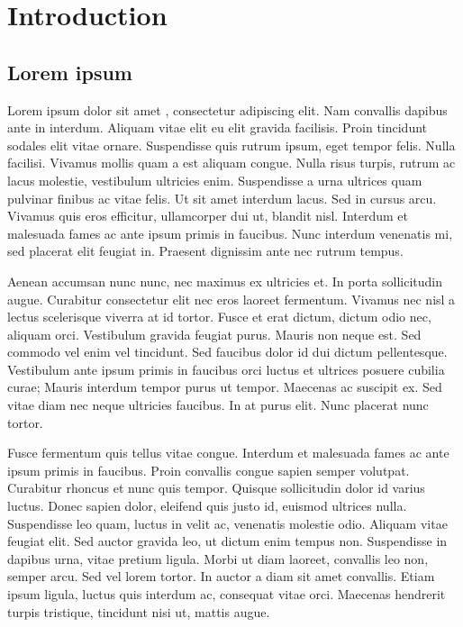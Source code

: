 \chapter{Introduction}

\section{Lorem ipsum}

Lorem ipsum dolor sit amet \cite{fake_citation} \cite{nichol2018gottalearnfast}, consectetur adipiscing elit. Nam convallis dapibus ante in interdum. Aliquam vitae elit eu elit gravida facilisis. Proin tincidunt sodales elit vitae ornare. Suspendisse quis rutrum ipsum, eget tempor felis. Nulla facilisi. Vivamus mollis quam a est aliquam congue. Nulla risus turpis, rutrum ac lacus molestie, vestibulum ultricies enim. Suspendisse a urna ultrices quam pulvinar finibus ac vitae felis. Ut sit amet interdum lacus. Sed in cursus arcu. Vivamus quis eros efficitur, ullamcorper dui ut, blandit nisl. Interdum et malesuada fames ac ante ipsum primis in faucibus. Nunc interdum venenatis mi, sed placerat elit feugiat in. Praesent dignissim ante nec rutrum tempus.

Aenean accumsan nunc nunc, nec maximus ex ultricies et. In porta sollicitudin augue. Curabitur consectetur elit nec eros laoreet fermentum. Vivamus nec nisl a lectus scelerisque viverra at id tortor. Fusce et erat dictum, dictum odio nec, aliquam orci. Vestibulum gravida feugiat purus. Mauris non neque est. Sed commodo vel enim vel tincidunt. Sed faucibus dolor id dui dictum pellentesque. Vestibulum ante ipsum primis in faucibus orci luctus et ultrices posuere cubilia curae; Mauris interdum tempor purus ut tempor. Maecenas ac suscipit ex. Sed vitae diam nec neque ultricies faucibus. In at purus elit. Nunc placerat nunc tortor.

Fusce fermentum quis tellus vitae congue. Interdum et malesuada fames ac ante ipsum primis in faucibus. Proin convallis congue sapien semper volutpat. Curabitur rhoncus et nunc quis tempor. Quisque sollicitudin dolor id varius luctus. Donec sapien dolor, eleifend quis justo id, euismod ultrices nulla. Suspendisse leo quam, luctus in velit ac, venenatis molestie odio. Aliquam vitae feugiat elit. Sed auctor gravida leo, ut dictum enim tempus non. Suspendisse in dapibus urna, vitae pretium ligula. Morbi ut diam laoreet, convallis leo non, semper arcu. Sed vel lorem tortor. In auctor a diam sit amet convallis. Etiam ipsum ligula, luctus quis interdum ac, consequat vitae orci. Maecenas hendrerit turpis tristique, tincidunt nisi ut, mattis augue.


